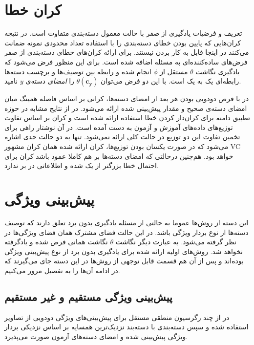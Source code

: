    


\section{کران خطا}\label{bound}
تعریف و فرضیات یادگیری از صفر با حالت معمول دسته‌بندی متفاوت است. در نتیجه کران‌هایی که پایین بودن خطای دسته‌بندی را با استفاده تعداد محدودی نمونه ضمانت می‌کنند در اینجا قابل به کار بردن نیستند. برای ارائه کران‌های خطای دسته‌بندی از صفر فرض‌های ساده‌کننده‌ای به مسئله اضافه شده است. برای این منظور فرض می‌شود که یادگیری نگاشت 
$\theta$
 مستقل از $\phi$ انجام شده و رابطه بین توصیف‌ها و برچسب دسته‌ها رابطه‌ای یک به یک است. با این دو فرض می‌توان
  $\theta(\mathbf{c_y} ) $
   را \emph{ امضای}  دسته‌ی $y$ نامید. 

در \cite{hinton09} با فرض دودویی بودن هر بعد از امضای دسته‌ها، کرانی  بر اساس فاصله همینگ 
میان امضای دسته‌ی صحیح و مقدار پیش‌بینی شده ارائه می‌شود. در \cite{emb15} از نتایج مشابه در حوزه تطبیق دامنه برای کران‌دار کردن خطا استفاده ارائه شده است و کران بر اساس تفاوت توزیع‌های داده‌های آموزش و آزمون به دست آمده است. در آن نوشتار راهی برای تخمین تفاوت این دو توزیع در حالت کلی ارائه نمی‌شود. تنها به دو حالت حدی اشاره می‌شود که در صورت یکسان بودن توزیع‌ها، کران ارائه شده همان کران مشهور VC \cite{vapnik} خواهد بود. هم‌چنین درحالتی که امضای دسته‌ها بر هم کاملا عمود باشد کران برای احتمال خطا بزرگتر از یک شده و اطلاعاتی در بر ندارد. 
\section{پیش‌بینی ویژگی  }
این دسته از روش‌ها عموما به حالتی از مسئله یادگیری بدون برد تعلق دارند که توصیف دسته‌ها از نوع بردار ویژگی باشد. در این حالت فضای مشترک همان فضای ویژگی‌ها در نظر گرفته می‌شود. به عبارت دیگر نگاشت $\theta$ نگاشت همانی فرض شده و یادگرفته نخواهد شد. روش‌های اولیه ارائه شده برای یادگیری بدون برد از نوع پیش‌بینی ویژگی
بوده‌اند و پس از آن‌ هم قسمت قابل توجهی از روش‌ها در این دسته جای می‌گیرند که در ادامه آن‌ها را به تفصیل مرور می‌کنیم.

\subsection{پیش‌بینی ویژگی مستقیم و غیر مستقیم}

در \cite{hinton09} از چند رگرسیون منطقی  مستقل برای پیش‌بینی‌های ویژگی دودویی از تصاویر  استفاده شده و سپس دسته‌بندی با دسته‌بند نزدیک‌ترین همسایه بر اساس نزدیکی بردار ویژگی پیش‌بینی شده و امضای دسته‌های آزمون صورت می‌پذیرد.

